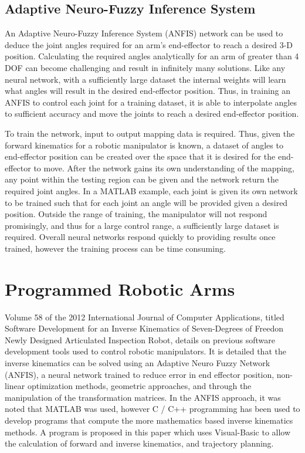 \documentclass[12pt,openany,a4paper]{book}
\begin{document}
\subsection{Adaptive Neuro-Fuzzy Inference System}
An Adaptive Neuro-Fuzzy Inference System (ANFIS) network can be used to deduce the joint angles required for an arm's end-effector to reach a desired 3-D position. Calculating the required angles analytically for an arm of greater than 4 DOF can become challenging and result in infinitely many solutions. Like any neural network, with a sufficiently large dataset the internal weights will learn what angles will result in the desired end-effector position. Thus, in training an ANFIS to control each joint for a training dataset, it is able to interpolate angles to sufficient accuracy and move the joints to reach a desired end-effector position.

To train the network, input to output mapping data is required. Thus, given the forward kinematics for a robotic manipulator is known, a dataset of angles to end-effector position can be created over the space that it is desired for the end-effector to move. After the network gains its own understanding of the mapping, any point within the testing region can be given and the network return the required joint angles. In a MATLAB example, each joint is given its own network to be trained such that for each joint an angle will be provided given a desired position. Outside the range of training, the manipulator will not respond promisingly, and thus for a large control range, a sufficiently large dataset is required. Overall neural networks respond quickly to providing results once trained, however the training process can be time consuming.

\section{Programmed Robotic Arms}
Volume 58 of the 2012 International Journal of Computer Applications, titled Software Development for an Inverse Kinematics of Seven-Degrees of Freedon Newly Designed Articulated Inspection Robot, details on previous software development tools used to control robotic manipulators. It is detailed that the inverse kinematics can be solved using an Adaptive Neuro Fuzzy Network (ANFIS), a neural network trained to reduce error in end effector position, non-linear optimization methods, geometric approaches, and through the manipulation of the transformation matrices. In the ANFIS approach, it was noted that MATLAB was used, however C / C++ programming has been used to develop programs that compute the more mathematics based inverse kinematics methods. A program is proposed in this paper which uses Visual-Basic to allow the calculation of forward and inverse kinematics, and trajectory planning.\\
\end{document}
